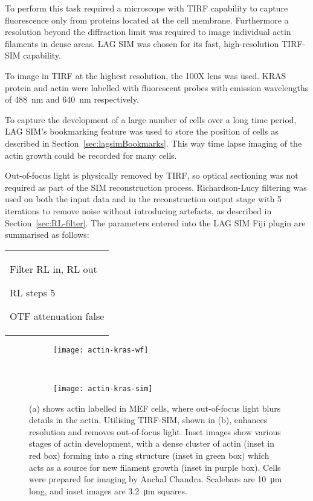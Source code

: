 To perform this task required a microscope with TIRF capability to capture fluorescence only from proteins located at the cell membrane. 
Furthermore a resolution beyond the diffraction limit was required to image individual actin filaments in dense areas. 
LAG SIM was chosen for its fast, high-resolution TIRF-SIM capability. 

To image in TIRF at the highest resolution, the 100X  lens was used. 
KRAS protein and actin were labelled with fluorescent probes with emission wavelengths of \SI{488}{\nano\metre} and \SI{640}{\nano\metre} respectively. 
 
To capture the development of a large number of cells over a long time period, LAG SIM's bookmarking feature was used to store the position of cells as described in Section~\ref{sec:lagsimBookmarks}.
This way time lapse imaging of the actin growth could be recorded for many cells.

Out-of-focus light is physically removed by TIRF, so optical sectioning was not required as part of the SIM reconstruction process.
Richardson-Lucy filtering was used on both the input data and in the reconstruction output stage with 5 iterations to remove noise without introducing artefacts, as described in Section~\ref{sec:RL-filter}.
The parameters entered into the LAG SIM Fiji plugin are summarised as follows: \newline 
\begin{tabular}{p{}}
\begin{labelling}[margin=OTF attenuation]
	\item[Filter] RL in, RL out
	\item[RL steps] 5
	\item[OTF attenuation] false
\end{labelling}
\end{tabular}

\begin{figure}[tbp!]
\centering
\begin{subfigure}[b]{0.85\textwidth}
	\texttt{[image: actin-kras-wf]}
	\caption{}\label{fig:widefield-actin}
\end{subfigure}

~\newline
\begin{subfigure}[b]{0.85\textwidth}
	\texttt{[image: actin-kras-sim]}
	\caption{}\label{fig:recon-tirf-actin}
\end{subfigure}
\caption[LAG SIM: TIRF imaging of actin in MEF cells removes out-of-focus light]{(a) shows actin labelled in MEF cells, where out-of-focus light blurs details in the actin. Utilising TIRF-SIM, shown in (b), enhances resolution and removes out-of-focus light. Inset images show various stages of actin development, with a dense cluster of actin (inset in red box) forming into a ring structure (inset in green box) which acts as a source for new filament growth (inset in purple box). Cells were prepared for imaging by Anchal Chandra. Scalebars are \SI{10}{\micro\metre} long, and inset images are \SI{3.2}{\micro\metre} squares.}
\label{fig:recon-actin}
\end{figure}
\afterpage{\clearpage}

